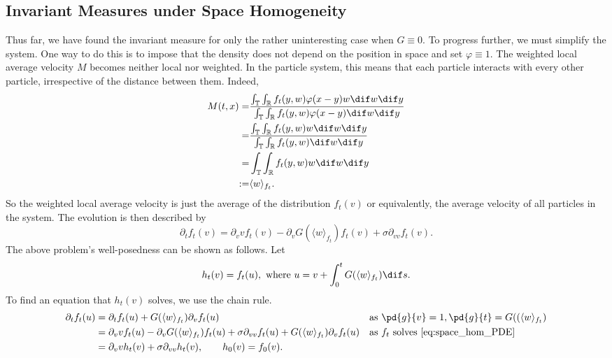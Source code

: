 \documentclass[11pt, a4pape draft]{article}
\renewcommand{\phi}{\varphi}
\renewcommand{\R}{\mathbb{R}}
\newcommand{\T}{\mathbb{T}}
\begin{document}
        \subsection{Invariant Measures under Space Homogeneity}
        Thus far, we have found the invariant measure for only the rather uninteresting case when $G \equiv 0$. To progress further, we must simplify the system. One way to do this is to impose that the density does not depend on the position in space and set $\phi \equiv 1$. The weighted local average velocity $M$ becomes neither local nor weighted. In the particle system, this means that each particle interacts with every other particle, irrespective of the distance between them. Indeed,
        \begin{align*}
            M(t,x) =&  \frac{\int_{\T}\int_{\R}f_t(y,w)\phi(x-y)w\dif w \dif y}{\int_{\T}\int_{\R}f_t(y,w)\phi(x-y)\dif w \dif y}\\
            =&  \frac{\int_{\T}\int_{\R}f_t(y,w)w\dif w \dif y}{\int_{\T}\int_{\R}f_t(y,w)\dif w \dif y}\\
            =& \int_{\T}\int_{\R}f_t(y,w)w\dif w \dif y\\
            :=& \langle w \rangle_{f_t}.
        \end{align*}
        So the weighted local average velocity is just the average of the distribution $f_t(v)$ or equivalently, the average velocity of all particles in the system. The evolution is then described by
        \begin{equation}\label{eq:space_hom_PDE}
            \partial_t f_t(v) = \partial_v vf_t(v) - \partial_v G(\langle w \rangle_{f_t})f_t(v) + \sigma \partial_{vv} f_t(v).
        \end{equation}
        The above problem's well-posedness can be shown as follows. Let
        \[
            h_t(v) = f_t(u),\text{ where } u = v + \int_0^t G(\langle w\rangle_{f_t}) \dif s.
        \]
        To find an equation that $h_t(v)$ solves, we use the chain rule.
        \begin{align*}
            \partial_t f_t(u) &= \partial_t f_t(u) +  G(\langle w\rangle_{f_t})\partial_v f_t(u) && \text{as   } \pd{g}{v} = 1, \pd{g}{t} = G((\langle w\rangle_{f_t})\\
            &=\partial_v vf_t(u) - \partial_v G(\langle w \rangle_{f_t})f_t(u) + \sigma \partial_{vv} f_t(u) + G(\langle w\rangle_{f_t})\partial_v f_t(u) &&\text{as  } f_t \text{ solves } \eqref{eq:space_hom_PDE}\\
            &=\partial_v vh_t(v) + \sigma \partial_{vv} h_t(v) , \qquad h_0(v) =f_0(v).
        \end{align*}
\end{document}

